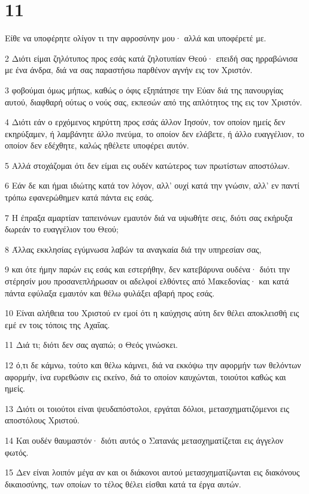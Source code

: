\chapter{11}

\par Είθε να υποφέρητε ολίγον τι την αφροσύνην μου· αλλά και υποφέρετέ με.
\par 2 Διότι είμαι ζηλότυπος προς εσάς κατά ζηλοτυπίαν Θεού· επειδή σας ηρραβώνισα με ένα άνδρα, διά να σας παραστήσω παρθένον αγνήν εις τον Χριστόν.
\par 3 φοβούμαι όμως μήπως, καθώς ο όφις εξηπάτησε την Εύαν διά της πανουργίας αυτού, διαφθαρή ούτως ο νούς σας, εκπεσών από της απλότητος της εις τον Χριστόν.
\par 4 Διότι εάν ο ερχόμενος κηρύττη προς εσάς άλλον Ιησούν, τον οποίον ημείς δεν εκηρύξαμεν, ή λαμβάνητε άλλο πνεύμα, το οποίον δεν ελάβετε, ή άλλο ευαγγέλιον, το οποίον δεν εδέχθητε, καλώς ηθέλετε υποφέρει αυτόν.
\par 5 Αλλά στοχάζομαι ότι δεν είμαι εις ουδέν κατώτερος των πρωτίστων αποστόλων.
\par 6 Εάν δε και ήμαι ιδιώτης κατά τον λόγον, αλλ' ουχί κατά την γνώσιν, αλλ' εν παντί τρόπω εφανερώθημεν κατά πάντα εις εσάς.
\par 7 Η έπραξα αμαρτίαν ταπεινόνων εμαυτόν διά να υψωθήτε σεις, διότι σας εκήρυξα δωρεάν το ευαγγέλιον του Θεού;
\par 8 Άλλας εκκλησίας εγύμνωσα λαβών τα αναγκαία διά την υπηρεσίαν σας,
\par 9 και ότε ήμην παρών εις εσάς και εστερήθην, δεν κατεβάρυνα ουδένα· διότι την στέρησίν μου προσανεπλήρωσαν οι αδελφοί ελθόντες από Μακεδονίας· και κατά πάντα εφύλαξα εμαυτόν και θέλω φυλάξει αβαρή προς εσάς.
\par 10 Είναι αλήθεια του Χριστού εν εμοί ότι η καύχησις αύτη δεν θέλει αποκλεισθή εις εμέ εν τοις τόποις της Αχαΐας.
\par 11 Διά τι; διότι δεν σας αγαπώ; ο Θεός γινώσκει.
\par 12 ό,τι δε κάμνω, τούτο και θέλω κάμνει, διά να εκκόψω την αφορμήν των θελόντων αφορμήν, ίνα ευρεθώσιν εις εκείνο, διά το οποίον καυχώνται, τοιούτοι καθώς και ημείς.
\par 13 Διότι οι τοιούτοι είναι ψευδαπόστολοι, εργάται δόλιοι, μετασχηματιζόμενοι εις αποστόλους Χριστού.
\par 14 Και ουδέν θαυμαστόν· διότι αυτός ο Σατανάς μετασχηματίζεται εις άγγελον φωτός.
\par 15 Δεν είναι λοιπόν μέγα αν και οι διάκονοι αυτού μετασχηματίζωνται εις διακόνους δικαιοσύνης, των οποίων το τέλος θέλει είσθαι κατά τα έργα αυτών.
